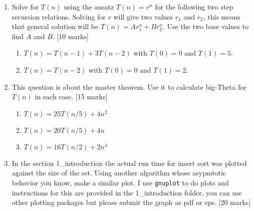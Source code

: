 \documentclass[11pt,a4paper]{scrartcl}
\begin{document}
\begin{enumerate}
\begin{enumerate}
\end{enumerate}

\item Solve for $T(n)$ using the ansatz $T(n)=r^n$ for the following
  two step recursion relations. Solving for $r$ will give two values
  $r_1$ and $r_2$, this means that general solution will be
  $T(n)=Ar_1^n+Br_2^n$. Use the two base values to find $A$ and $B$.  [10 marks]

\begin{enumerate}
\item $T(n)=T(n-1)+3T(n-2)$ with $T(0)=0$ and $T(1)=5$.
\item $T(n)=T(n-2)$ with $T(0)=0$ and $T(1)=2$.
\end{enumerate}

\item This question is about the master theorem. Use it to
  calculate big-Theta for $T(n)$ in each case.  [15 marks] 

\begin{enumerate}
\item $T(n)= 25T(n/5)+4n^2$
\item $T(n)= 20T(n/5)+4n$
\item $T(n)= 16T(n/2)+2n^4$
\end{enumerate}

\item In the section 1\_introduction the actual run time
  for insert sort was plotted against the size of the set. Using
  another algorithm whose asypmtotic behavior you know, make a similar
  plot. I use \texttt{gnuplot} to do plots and instructions for this
  are provided in the 1\_introduction folder, you can use other
  plotting packages but please submit the graph as pdf or eps.  [20 marks]

\end{enumerate}
\end{document}
